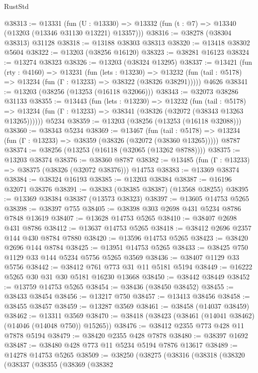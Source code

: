 \begin{lexlean}{RustStd}
\begin{coremodule}
@38313 := @13331
    (fun (U : @13330) => @13332 (fun (t : @7) => @13340 (@13203 (@13346 @31130 @13221) @13357)))
@38316 := @38278 (@38304 @38313) @31128
@38318 := @13188 @38303 @38313
@38320 := @13418 @38302 @5604
@38322 := @13203 (@38256 @16120)
@38323 := @38281 @16123
@38324 := @13274 @38323
@38326 := @13203 (@38324 @13295)
@38337 := @13421
    (fun (rty : @4160) =>
    @13231
      (fun (lets : @13230) =>
      @13232 (fun (tail : @5178) => @13234 (fun (Γ : @13233) => @38322 (@38326 @38291)))))
    @4626
@38341 := @13203 (@38256 (@13253 (@16118 @32066)))
@38343 := @32073 @38286 @31133
@38355 := @13443
    (fun (lets : @13230) =>
    @13232
      (fun (tail : @5178) =>
      @13234 (fun (Γ : @13233) => @38341 (@38326 (@32072 (@38343 @13263 @13265))))))
    @5234
@38359 := @13203 (@38256 (@13253 (@16118 @32088)))
@38360 := @38343 @5234
@38369 := @13467
    (fun (tail : @5178) => @13234 (fun (Γ : @13233) => @38359 (@38326 (@32072 (@38360 @13265)))))
    @8787
@38374 := @38256 (@13253 (@16118 (@32065 (@13262 @8788))))
@38375 := @13203 @38374
@38376 := @38360 @8787
@38382 := @13485 (fun (Γ : @13233) => @38375 (@38326 (@32072 @38376))) @14753
@38383 := @13369 @38374
@38384 := @38324 @16193
@38385 := @13203 @38384
@38387 := @16196 @32071 @38376
@38391 := @38383 (@38385 @38387) (@13568 @38255)
@38395 := @13369 @38384 @38387 (@13573 @38323)
@38397 := @13605 @14753 @5265
@38398 := @38397 @755
@38405 := @38398 @303 @2698 @431 @5234 @8786 @7848 @13619
@38407 := @13628 @14753 @5265
@38410 := @38407 @2698 @431 @8786
@38412 := @13637 @14753 @5265
@38418 := @38412 @2696 @2357 @144 @430 @8784 @7880
@38420 := @13596 @14753 @5265
@38423 := @38420 @2696 @144 @8784
@38425 := @13951 @14753 @5265
@38433 := @38425 @750 @1129 @33 @144 @5234 @5756 @5265 @3569
@38436 := @38407 @1129 @33 @5756
@38442 := @38412 @761 @773 @31 @11 @5181 @5194
@38449 := @16222 @5265 @30 @31 @30 @5181 @16230 @13668
@38450 := @38442 @38449
@38452 := @13759 @14753 @5265
@38454 := @38436 (@38450 @38452)
@38455 := @38433 @38454
@38456 := @13217 @750
@38457 := @13413 @38456
@38458 := @38455 @38457
@38459 := @13287 @3569
@38461 := @38458 (@14037 @38459)
@38462 := @13311 @3569
@38470 := @38418 (@38423 (@38461 (@14041 @38462) (@14046 (@14048 @750)) @15265))
@38476 := @38412 @2355 @773 @428 @11 @7878 @5194
@38479 := @38420 @2355 @428 @7878
@38480 := @38397 @1692
@38487 := @38480 @428 @773 @11 @5234 @5194 @7876 @13617
@38489 := @14278 @14753 @5265
@38509 := @38250
    (@38275
      (@38316
        (@38318
          (@38320
            (@38337
              (@38355
                (@38369
                  (@38382

\end{coremodule}
\end{lexlean}
